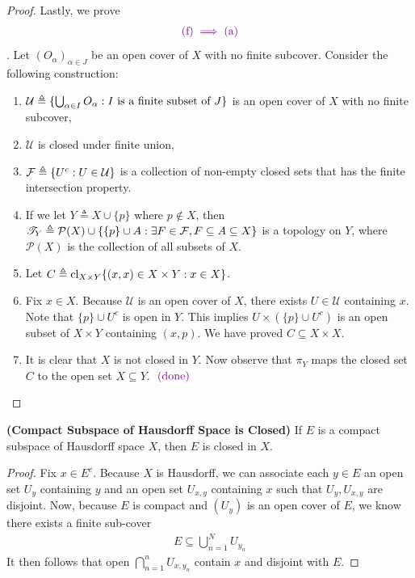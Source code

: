 \documentclass{report}
\begin{document}
\begin{proof}
Lastly, we prove 
\begin{align*}
\textcolor{violet}{(\text{f})\implies (\text{a})}
\end{align*}
. Let $(O_\alpha)_{\alpha \in J}$ be an open cover of $X$ with no finite subcover. Consider the following construction:
\begin{enumerate}[label=(\alph*)]
    \item $\mathcal{U} \triangleq \{ \bigcup_{\alpha \in I} O_\alpha : I \text{ is a finite subset of } J \}$ is an open cover of $X$ with no finite subcover,
    \item $\mathcal{U}$ is closed under finite union,
    \item $\mathcal{F} \triangleq \{ U^c : U \in \mathcal{U} \}$ is a collection of non-empty closed sets that has the finite intersection property.
    \item If we let $Y \triangleq X \cup \{p\}$ where $p \notin X$, then $\mathscr{T}_Y \triangleq \mathcal{P}(X) \cup \{ \{p\} \cup A : \exists F \in \mathcal{F}, F \subseteq A \subseteq X \}$ is a topology on $Y$, where $\mathcal{P}(X)$ is the collection of all subsets of $X$.
    \item Let $C \triangleq \operatorname{cl}_{X \times Y} \{ (x, x) \in X \times Y : x \in X \}$.
    \item Fix $x \in X$. Because $\mathcal{U}$ is an open cover of $X$, there exists $U \in \mathcal{U}$ containing $x$. Note that $\{p\} \cup U^c$ is open in $Y$. This implies $U \times (\{p\} \cup U^c)$ is an open subset of $X \times Y$ containing $(x, p)$. We have proved $C \subseteq X \times X$.
    \item It is clear that $X$ is not closed in $Y$. Now observe that $\pi_Y$ maps the closed set $C$ to the open set $X \subseteq Y$. \CaC $\textcolor{violet}{\text{ (done) }}$
\end{enumerate}
\end{proof}
\begin{theorem}
\label{Compact Subspace of Hausdorff Space is Closed}
\textbf{(Compact Subspace of Hausdorff Space is Closed)} If $E$ is a compact subspace of Hausdorff space $X$, then $E$ is closed in  $X$. 
\end{theorem}
\begin{proof}
Fix $x \in E^c$. Because $X$ is Hausdorff, we can associate each $y \in E$ an open set $U_y$ containing $y$ and an open set  $U_{x,y}$ containing $x$ such that  $U_y,U_{x,y}$ are disjoint. Now, because $E$ is compact and $(U_y)$ is an open cover of $E$, we know there exists a finite sub-cover 
\begin{align*}
E\subseteq \bigcup_{n=1}^N U_{y_n} 
\end{align*}
It then follows that open $\bigcap_{n=1}^n U_{x,y_n}$ contain $x$ and disjoint with $E$. 
\end{proof}
\end{document}
